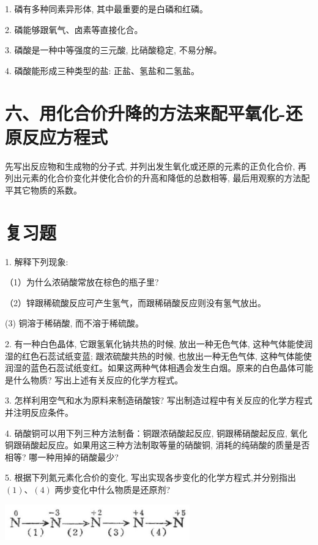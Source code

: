 \documentclass[10pt]{article}
\begin{document}
1. 磷有多种同素异形体, 其中最重要的是白磷和红磷。

2. 磷能够跟氧气、卤素等直接化合。

3. 磷酸是一种中等强度的三元酸, 比硝酸稳定, 不易分解。

4. 磷酸能形成三种类型的盐: 正盐、氢盐和二氢盐。

\section*{六、用化合价升降的方法来配平氧化-还原反应方程式}

先写出反应物和生成物的分子式, 并列出发生氧化或还原的元素的正负化合价, 再列出元素的化合价变化并使化合价的升高和降低的总数相等, 最后用观察的方法配平其它物质的系数。

\section*{复习题}

1. 解释下列现象:

（1）为什么浓硝酸常放在棕色的瓶子里?

（2）锌跟稀硫酸反应可产生氢气，而跟稀硝酸反应则没有氢气放出。

(3) 铜溶于稀硝酸, 而不溶于稀硫酸。

2. 有一种白色晶体, 它跟氢氧化钠共热的时候, 放出一种无色气体, 这种气体能使润湿的红色石蕊试纸变蓝; 跟浓硫酸共热的时候, 也放出一种无色气体, 这种气体能使润湿的蓝色石蕊试纸变红。如果这两种气体相遇会发生白烟。原来的白色晶体可能是什么物质? 写出上述有关反应的化学方程式。

3. 怎样利用空气和水为原料来制造硝酸铵? 写出制造过程中有关反应的化学方程式并注明反应条件。

4. 硝酸铜可以用下列三种方法制备：铜跟浓硝酸起反应, 铜跟稀硝酸起反应, 氧化铜跟硝酸起反应。如果用这三种方法制取等量的硝酸铜, 消耗的纯硝酸的质量是否相等? 哪一种用掉的硝酸最少?

5. 根据下列氮元素化合价的变化, 写出实现各步变化的化学方程式,并分别指出 \(\left( 1\right) \text{、}\left( 4\right)\) 两步变化中什么物质是还原剂?

\begin{center}
\includegraphics[max width=0.6\textwidth]{images/01912d13-9986-7822-a012-3f3f7be99dcb_64_557691.jpg}
\end{center}
\end{document}
